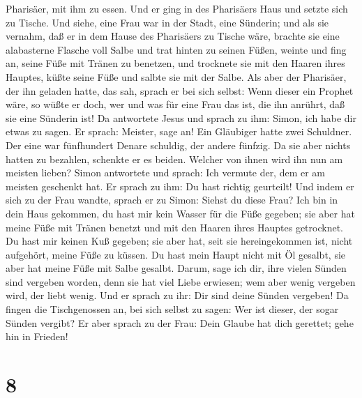 Pharisäer, mit ihm zu essen. Und er ging in des Pharisäers Haus und
setzte sich zu Tische.  Und siehe, eine Frau war in der
Stadt, eine Sünderin; und als sie vernahm, daß er in dem Hause des
Pharisäers zu Tische wäre, brachte sie eine alabasterne Flasche voll
Salbe  und trat hinten zu seinen Füßen, weinte und fing
an, seine Füße mit Tränen zu benetzen, und trocknete sie mit den Haaren
ihres Hauptes, küßte seine Füße und salbte sie mit der Salbe.
 Als aber der Pharisäer, der ihn geladen hatte, das sah,
sprach er bei sich selbst: Wenn dieser ein Prophet wäre, so wüßte er
doch, wer und was für eine Frau das ist, die ihn anrührt, daß sie eine
Sünderin ist!  Da antwortete Jesus und sprach zu ihm:
Simon, ich habe dir etwas zu sagen. Er sprach: Meister, sage an!
 Ein Gläubiger hatte zwei Schuldner. Der eine war
fünfhundert Denare schuldig, der andere fünfzig.  Da sie
aber nichts hatten zu bezahlen, schenkte er es beiden. Welcher von ihnen
wird ihn nun am meisten lieben?  Simon antwortete und
sprach: Ich vermute der, dem er am meisten geschenkt hat. Er sprach zu
ihm: Du hast richtig geurteilt!  Und indem er sich zu der
Frau wandte, sprach er zu Simon: Siehst du diese Frau? Ich bin in dein
Haus gekommen, du hast mir kein Wasser für die Füße gegeben; sie aber
hat meine Füße mit Tränen benetzt und mit den Haaren ihres Hauptes
getrocknet.  Du hast mir keinen Kuß gegeben; sie aber
hat, seit sie hereingekommen ist, nicht aufgehört, meine Füße zu küssen.
 Du hast mein Haupt nicht mit Öl gesalbt, sie aber hat
meine Füße mit Salbe gesalbt.  Darum, sage ich dir, ihre
vielen Sünden sind vergeben worden, denn sie hat viel Liebe erwiesen;
wem aber wenig vergeben wird, der liebt wenig.  Und er
sprach zu ihr: Dir sind deine Sünden vergeben!  Da fingen
die Tischgenossen an, bei sich selbst zu sagen: Wer ist dieser, der
sogar Sünden vergibt?  Er aber sprach zu der Frau: Dein
Glaube hat dich gerettet; gehe hin in Frieden!

\hypertarget{section-7}{%
\section{8}\label{section-7}}

